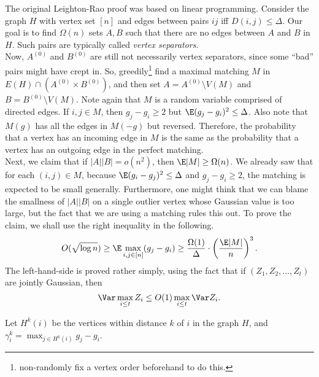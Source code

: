 	The original Leighton-Rao proof was based on linear programming. Consider the graph $H$ with vertex set $[n]$ and edges between pairs $ij$ iff $D(i,j) \le \Delta$. Our goal is to find $\Omega(n)$ sets $A,B$ such that there are no edges between $A$ and $B$ in $H$. Such pairs are typically called \emph{vertex separators}.\\
	Now, $A^{(0)}$ and $B^{(0)}$ are still not necessarily vertex separators, since some ``bad'' pairs might have crept in. So, greedily\footnote{non-randomly fix a vertex order beforehand to do this.} find a maximal matching $M$ in $E(H) \cap (A^{(0)} \times B^{(0)})$, and then set $A = A^{(0)} \setminus V(M)$ and $B = B^{(0)} \setminus V(M)$. Note again that $M$ is a random variable comprised of directed edges. If $i,j \in M$, then $g_j - g_i \ge 2$ but $\E (g_j - g_i)^2 \le \Delta$. Also note that $M(g)$ has all the edges in $M(-g)$ but reversed. Therefore, the probability that a vertex has an incoming edge in $M$ is the same as the probability that a vertex has an outgoing edge in the perfect matching.\\
	Next, we claim that if $|A||B| = o(n^2)$, then $\E |M| \ge \Omega(n)$. We already saw that for each $(i,j) \in M$, because $\E (g_i - g_j)^2 \le \Delta$ and $g_j - g_i \ge 2$, the matching is expected to be small generally. Furthermore, one might think that we can blame the smallness of $|A||B|$ on a single outlier vertex whose Gaussian value is too large, but the fact that we are using a matching rules this out. To prove the claim, we shall use the right inequality in the following.
	\[ O(\sqrt{\log n}) \ge \E \max_{i,j \in [n]} (g_j - g_i) \ge \frac{\Omega(1)}{\Delta} \cdot \left( \frac{\E |M|}{n} \right)^3. \]
	The left-hand-side is proved rather simply, using the fact that if $(Z_1,Z_2,\ldots,Z_t)$ are jointly Gaussian, then
	\[ \Var \max_{i \le t} Z_i \le O(1) \max_{i \le t} \Var Z_i. \]

	Let $H^k(i)$ be the vertices within distance $k$ of $i$ in the graph $H$, and $\gamma_i^k = \max_{j \in H^k(i)} g_j - g_i$.


	

